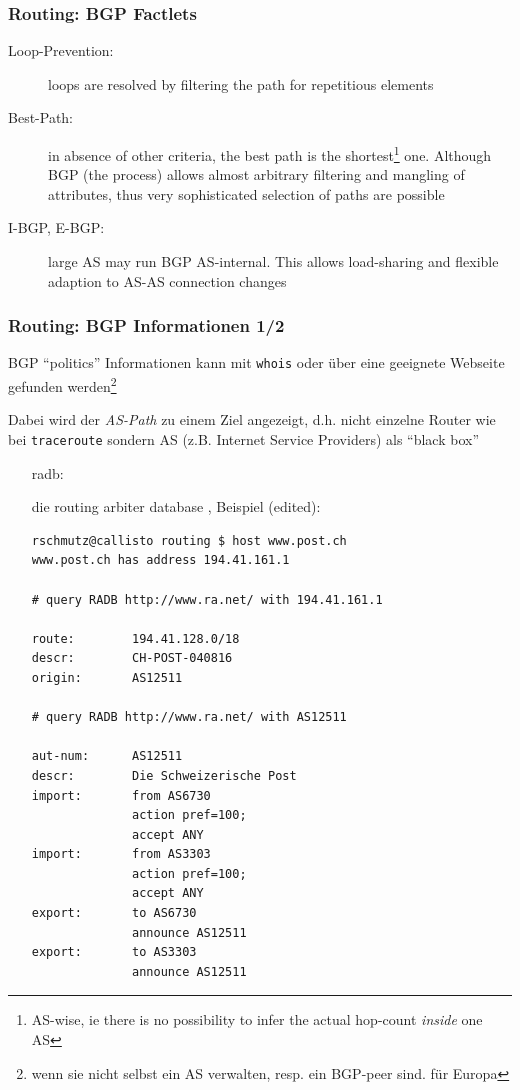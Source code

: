 \documentclass[ignorenonframetext]{beamer}
\begin{document}
\begin{frame}
\frametitle{Routing: BGP Factlets}
\begin{description}
	\item[Loop-Prevention:] loops are resolved by filtering the path for repetitious elements
	\item[Best-Path:] in absence of other criteria, the best path is the shortest\footnote{AS-wise, ie
		there is no possibility to infer the actual hop-count \emph{inside} one AS} one. Although
		BGP (the process) allows almost arbitrary filtering and mangling of attributes, thus very
		sophisticated selection of paths are possible
	\item[I-BGP, E-BGP:] large AS may run BGP AS-internal. This allows load-sharing and
		flexible adaption to AS-AS connection changes
\end{description}
\end{frame}







\begin{frame}[fragile]
\frametitle{Routing: BGP Informationen 1/2}
BGP ``politics'' Informationen kann mit \texttt{whois} oder \"uber eine geeignete Webseite gefunden werden\footnote{wenn sie nicht selbst ein AS verwalten, resp. ein BGP-peer sind.  f\"ur Europa}
\begin{tiny}
Dabei wird der {\em AS-Path}{} zu einem Ziel angezeigt, d.h. nicht einzelne Router wie bei \texttt{traceroute} sondern AS (z.B. Internet Service Providers) als ``black box''
\end{tiny}
\begin{itemize}
	\item[radb:]{die routing arbiter database , Beispiel (edited):
	  \begin{tiny}
	  \begin{verbatim}
rschmutz@callisto routing $ host www.post.ch
www.post.ch has address 194.41.161.1

# query RADB http://www.ra.net/ with 194.41.161.1

route:	      194.41.128.0/18
descr:	      CH-POST-040816
origin:	      AS12511

# query RADB http://www.ra.net/ with AS12511

aut-num:      AS12511
descr:        Die Schweizerische Post
import:       from AS6730
              action pref=100;
              accept ANY
import:       from AS3303
              action pref=100;
              accept ANY
export:       to AS6730
              announce AS12511
export:       to AS3303
              announce AS12511
	  \end{verbatim}
	  \end{tiny}
	}
\end{itemize}
\end{frame}
\end{document}
